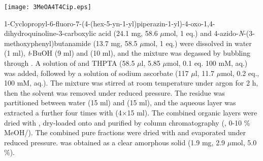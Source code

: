 
\begin{scheme}[H]
	\begin{center}
		\texttt{[image: 3MeOA4T4Cip.eps]}
	\end{center}
\end{scheme}

1-Cyclopropyl-6-fluoro-7-(4-(hex-5-yn-1-yl)piperazin-1-yl)-4-oxo-1,4\hyp{}dihydro\-quinoline-3-carboxylic acid  \allowbreak (24.1 mg, 58.6 $\mu$mol, 1 eq.) and 4\hyp{}azido\hyp{}\textit{N}\hyp{}(3\hyp{}methoxyphenyl)butanamide  (13.7 mg, 58.5 $\mu$mol, 1 eq.) were dissolved in water (1 ml), \textit{t}-BuOH (9 ml) and  (10 ml), and the mixture was degassed by bubbling through . A solution of  and THPTA (58.5 $\mu$l, 5.85 $\mu$mol, 0.1 eq. 100 mM, aq.) was added, followed by a solution of sodium ascorbate (117 $\mu$l, 11.7 $\mu$mol, 0.2 eq., 100 mM, aq.). The mixture was stirred at room temperature under argon for 2 h, then the solvent was removed under reduced pressure. The residue was partitioned between water (15 ml) and  (15 ml), and the aqueous layer was extracted a further four times with  (4$\times$15 ml). The combined organic layers were dried with , dry-loaded onto  and purified by column chromatography (, 0-10 \% MeOH/). The combined pure fractions were dried with  and evaporated under reduced pressure.  was obtained as a clear amorphous solid (1.9 mg, 2.9 $\mu$mol, 5.0 \%).
\\[1\baselineskip]
\\[1\baselineskip]
\\[1\baselineskip]
